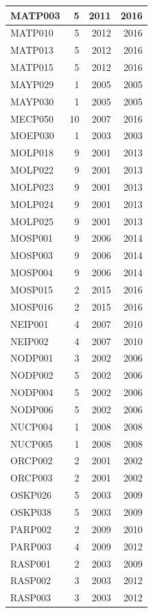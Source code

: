\documentclass[11pt,]{book}
\begin{document}
\begin{table}
\begin{tabular}[t]{l|r|r|r}
\hline
MATP003 & 5 & 2011 & 2016\\
\hline
MATP010 & 5 & 2012 & 2016\\
\hline
MATP013 & 5 & 2012 & 2016\\
\hline
MATP015 & 5 & 2012 & 2016\\
\hline
MAYP029 & 1 & 2005 & 2005\\
\hline
MAYP030 & 1 & 2005 & 2005\\
\hline
MECP050 & 10 & 2007 & 2016\\
\hline
MOEP030 & 1 & 2003 & 2003\\
\hline
MOLP018 & 9 & 2001 & 2013\\
\hline
MOLP022 & 9 & 2001 & 2013\\
\hline
MOLP023 & 9 & 2001 & 2013\\
\hline
MOLP024 & 9 & 2001 & 2013\\
\hline
MOLP025 & 9 & 2001 & 2013\\
\hline
MOSP001 & 9 & 2006 & 2014\\
\hline
MOSP003 & 9 & 2006 & 2014\\
\hline
MOSP004 & 9 & 2006 & 2014\\
\hline
MOSP015 & 2 & 2015 & 2016\\
\hline
MOSP016 & 2 & 2015 & 2016\\
\hline
NEIP001 & 4 & 2007 & 2010\\
\hline
NEIP002 & 4 & 2007 & 2010\\
\hline
NODP001 & 3 & 2002 & 2006\\
\hline
NODP002 & 5 & 2002 & 2006\\
\hline
NODP004 & 5 & 2002 & 2006\\
\hline
NODP006 & 5 & 2002 & 2006\\
\hline
NUCP004 & 1 & 2008 & 2008\\
\hline
NUCP005 & 1 & 2008 & 2008\\
\hline
ORCP002 & 2 & 2001 & 2002\\
\hline
ORCP003 & 2 & 2001 & 2002\\
\hline
OSKP026 & 5 & 2003 & 2009\\
\hline
OSKP038 & 5 & 2003 & 2009\\
\hline
PARP002 & 2 & 2009 & 2010\\
\hline
PARP003 & 4 & 2009 & 2012\\
\hline
RASP001 & 2 & 2003 & 2009\\
\hline
RASP002 & 3 & 2003 & 2012\\
\hline
RASP003 & 3 & 2003 & 2012\\

\end{tabular}
\end{table}
\end{document}
